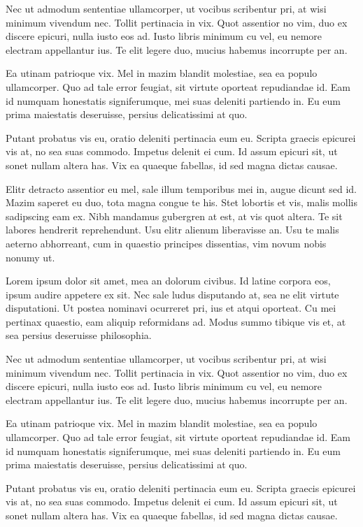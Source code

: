\documentclass[twoside, 12pt, dvipdfmx]{article}
\begin{document}
    Nec ut admodum sententiae ullamcorper, ut vocibus scribentur pri, at wisi minimum vivendum nec. Tollit pertinacia in vix. 
    Quot assentior no vim, duo ex discere epicuri, nulla iusto eos ad. Iusto libris minimum cu vel, eu nemore electram appellantur ius. 
    Te elit legere duo, mucius habemus incorrupte per an.

    Ea utinam patrioque vix. Mel in mazim blandit molestiae, sea ea populo ullamcorper. Quo ad tale error feugiat, 
    sit virtute oporteat repudiandae id. Eam id numquam honestatis signiferumque, mei suas deleniti partiendo in. 
    Eu eum prima maiestatis deseruisse, persius delicatissimi at quo.

    Putant probatus vis eu, oratio deleniti pertinacia eum eu. Scripta graecis epicurei vis at, no sea suas commodo. 
    Impetus delenit ei cum. Id assum epicuri sit, ut sonet nullam altera has. Vix ea quaeque fabellas, id sed magna dictas causae.

    Elitr detracto assentior eu mel, sale illum temporibus mei in, augue dicunt sed id. Mazim saperet eu duo, 
    tota magna congue te his. Stet lobortis et vis, malis mollis sadipscing eam ex. Nibh mandamus gubergren at est, 
    at vis quot altera. Te sit labores hendrerit reprehendunt. Usu elitr alienum liberavisse an. Usu te malis aeterno 
    abhorreant, cum in quaestio principes dissentias, vim novum nobis nonumy ut.

    Lorem ipsum dolor sit amet, mea an dolorum civibus. Id latine corpora eos, ipsum audire appetere ex sit. 
    Nec sale ludus disputando at, sea ne elit virtute disputationi. Ut postea nominavi ocurreret pri, ius et atqui oporteat. 
    Cu mei pertinax quaestio, eam aliquip reformidans ad. Modus summo tibique vis et, at sea persius deseruisse philosophia.

    Nec ut admodum sententiae ullamcorper, ut vocibus scribentur pri, at wisi minimum vivendum nec. Tollit pertinacia in vix. 
    Quot assentior no vim, duo ex discere epicuri, nulla iusto eos ad. Iusto libris minimum cu vel, eu nemore electram appellantur ius. 
    Te elit legere duo, mucius habemus incorrupte per an.

    Ea utinam patrioque vix. Mel in mazim blandit molestiae, sea ea populo ullamcorper. Quo ad tale error feugiat, 
    sit virtute oporteat repudiandae id. Eam id numquam honestatis signiferumque, mei suas deleniti partiendo in. 
    Eu eum prima maiestatis deseruisse, persius delicatissimi at quo.

    Putant probatus vis eu, oratio deleniti pertinacia eum eu. Scripta graecis epicurei vis at, no sea suas commodo. 
    Impetus delenit ei cum. Id assum epicuri sit, ut sonet nullam altera has. Vix ea quaeque fabellas, id sed magna dictas causae.
\end{document}
